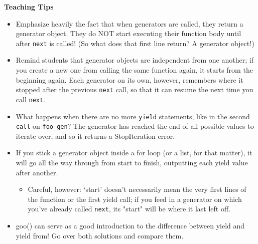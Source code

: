 \begin{blocksection}
\begin{guide}
\textbf{Teaching Tips}
\begin{itemize}
\item Emphasize heavily the fact that when generators are called, they return a generator object. They do NOT start executing their function body until after \texttt{next} is called! (So what does that first line return? A generator object!)
\item Remind students that generator objects are independent from one another; if you create a new one from calling the same function again, it starts from the beginning again. Each generator on its own, however, remembers where it stopped after the previous \texttt{next} call, so that it can resume the next time you call \texttt{next}.
\item What happens when there are no more \texttt{yield} statements, like in the second \texttt{call} on \texttt{foo\_gen}? The generator has reached the end of all possible values to iterate over, and so it returns a StopIteration error.
\item If you stick a generator object inside a for loop (or a list, for that matter), it will go all the way through from start to finish, outputting each yield value after another.
\begin{itemize}
\item Careful, however: `start' doesn't necessarily mean the very first lines of the function or the first yield call; if you feed in a generator on which you've already called \texttt{next}, its "start" will be where it last left off.
\end{itemize}
\item goo() can serve as a good introduction to the difference between yield and yield from! Go over both solutions and compare them.
\end{itemize}
\end{guide}
\end{blocksection}